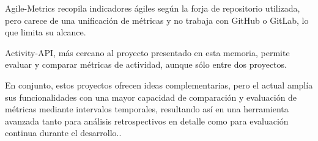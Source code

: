 Agile-Metrics recopila indicadores ágiles según la forja de repositorio utilizada, pero carece de una unificación de métricas y no trabaja con GitHub o GitLab, lo que limita su alcance. 

Activity-API, más cercano al proyecto presentado en esta memoria, permite evaluar y comparar métricas de actividad, aunque sólo entre dos proyectos. 

En conjunto, estos proyectos ofrecen ideas complementarias, pero el actual amplía sus funcionalidades con una mayor capacidad de comparación y evaluación de métricas mediante intervalos temporales, resultando así en una herramienta avanzada tanto para análisis retrospectivos en detalle como para evaluación continua durante el desarrollo..
